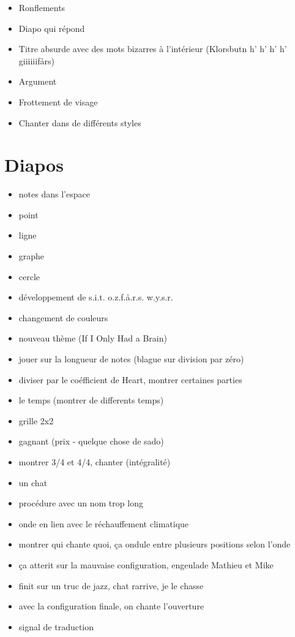\documentclass{article}
\begin{document}
\begin{itemize}
\item Ronflements
\item Diapo qui répond
\item Titre absurde avec des mots bizarres à l'intérieur (Klorsbutn h' h' h'
h' giiiiiifårs)
\item Argument
\item Frottement de visage
\item Chanter dans de différents styles
\end{itemize}
\section{Diapos}
\begin{itemize}
\item notes dans l'espace
\item point
\item ligne
\item graphe
\item cercle
\item développement de s.i.t. o.z.f.å.r.s. w.y.s.r.
\item changement de couleurs
\item nouveau thème (If I Only Had a Brain)
\item jouer sur la longueur de notes (blague sur division par zéro)
\item diviser par le coéfficient de Heart, montrer certaines parties
\item le temps (montrer de differents temps)
\item grille 2x2
\item gagnant (prix - quelque chose de sado)
\item montrer 3/4 et 4/4, chanter (intégralité)
\item un chat
\item procédure avec un nom trop long
\item onde en lien avec le réchauffement climatique
\item montrer qui chante quoi, ça ondule entre plusieurs positions selon l'onde
\item ça atterit sur la mauvaise configuration, engeulade Mathieu et Mike
\item finit sur un truc de jazz, chat rarrive, je le chasse
\item avec la configuration finale, on chante l'ouverture
\item signal de traduction
\end{itemize}
\end{document}
